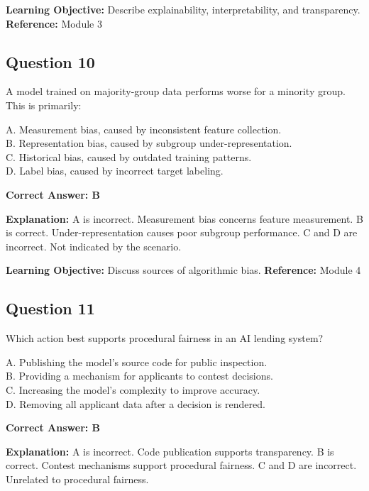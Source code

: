 \documentclass[11pt]{article}
\begin{document}
	\textbf{Learning Objective:} Describe explainability, interpretability,
	and transparency.
	\textbf{Reference:} Module 3
	
	\subsection*{Question 10}
	A model trained on majority-group data performs worse for a minority
	group. This is primarily:
	
	A. Measurement bias, caused by inconsistent feature collection.\\
	B. Representation bias, caused by subgroup under-representation.\\
	C. Historical bias, caused by outdated training patterns.\\
	D. Label bias, caused by incorrect target labeling.
	
	\vspace{0.4em}
	\textbf{Correct Answer: B}
	
	\textbf{Explanation:}
	A is incorrect. Measurement bias concerns feature measurement.
	B is correct. Under-representation causes poor subgroup performance.
	C and D are incorrect. Not indicated by the scenario.
	
	\textbf{Learning Objective:} Discuss sources of algorithmic bias.
	\textbf{Reference:} Module 4
	
	\subsection*{Question 11}
	Which action best supports procedural fairness in an AI lending system?
	
	A. Publishing the model's source code for public inspection.\\
	B. Providing a mechanism for applicants to contest decisions.\\
	C. Increasing the model's complexity to improve accuracy.\\
	D. Removing all applicant data after a decision is rendered.
	
	\vspace{0.4em}
	\textbf{Correct Answer: B}
	
	\textbf{Explanation:}
	A is incorrect. Code publication supports transparency.
	B is correct. Contest mechanisms support procedural fairness.
	C and D are incorrect. Unrelated to procedural fairness.
	
\end{document}
